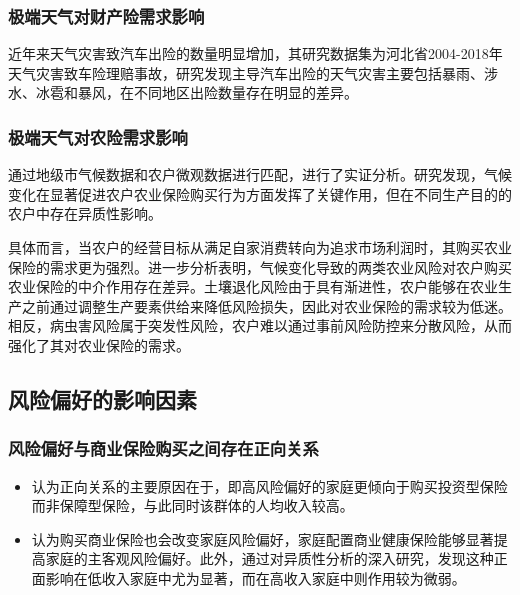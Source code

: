 \documentclass[a4paper,12pt]{ctexbeamer}
\begin{document}
\begin{frame}
    \frametitle{极端天气对财产险需求影响}
    近年来天气灾害致汽车出险的数量明显增加\citep{张翠华2020天气灾害致车险理赔的风险分析}，其研究数据集为河北省2004-2018年天气灾害致车险理赔事故，研究发现主导汽车出险的天气灾害主要包括暴雨、涉水、冰雹和暴风，在不同地区出险数量存在明显的差异。
\end{frame}

\begin{frame}
    \frametitle{极端天气对农险需求影响}
    \citet{胡新艳2021气候变化}通过地级市气候数据和农户微观数据进行匹配，进行了实证分析。研究发现，气候变化在显著促进农户农业保险购买行为方面发挥了关键作用，但在不同生产目的的农户中存在异质性影响。

    具体而言，当农户的经营目标从满足自家消费转向为追求市场利润时，其购买农业保险的需求更为强烈。进一步分析表明，气候变化导致的两类农业风险对农户购买农业保险的中介作用存在差异。土壤退化风险由于具有渐进性，农户能够在农业生产之前通过调整生产要素供给来降低风险损失，因此对农业保险的需求较为低迷。相反，病虫害风险属于突发性风险，农户难以通过事前风险防控来分散风险，从而强化了其对农业保险的需求。
\end{frame}


\subsection{风险偏好的影响因素}
\begin{frame}
    \frametitle{风险偏好与商业保险购买之间存在正向关系}
    \begin{itemize}
        \item \citet{宋章良2021我国中老年家庭风险偏好对商业保险购买行为的影响研究}认为正向关系的主要原因在于，即高风险偏好的家庭更倾向于购买投资型保险而非保障型保险，与此同时该群体的人均收入较高。
        \item \citet{孙武军2023商业健康保险的配置能够改变家庭的风险偏好吗}认为购买商业保险也会改变家庭风险偏好，家庭配置商业健康保险能够显著提高家庭的主客观风险偏好。此外，通过对异质性分析的深入研究，发现这种正面影响在低收入家庭中尤为显著，而在高收入家庭中则作用较为微弱。
    \end{itemize}
\end{frame}
\end{document}
